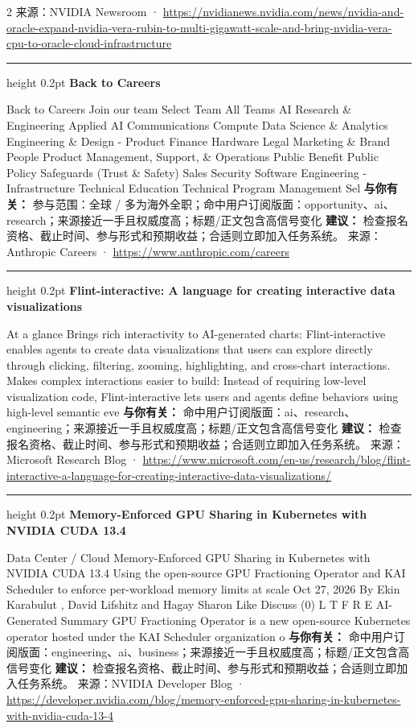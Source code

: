 \documentclass[10.5pt]{ctexart}
\begin{document}
\begin{multicols}{2}
{\footnotesize\color{ormuted} 来源：NVIDIA Newsroom · \url{https://nvidianews.nvidia.com/news/nvidia-and-oracle-expand-nvidia-vera-rubin-to-multi-gigawatt-scale-and-bring-nvidia-vera-cpu-to-oracle-cloud-infrastructure}}
\vspace{2mm}
\hrule height 0.2pt
\vspace{2mm}
{\large\bfseries Back to Careers}\par
Back to Careers Join our team Select Team All Teams AI Research \& Engineering Applied AI Communications Compute Data Science \& Analytics Engineering \& Design - Product Finance Hardware Legal Marketing \& Brand People Product Management, Support, \& Operations Public Benefit Public Policy Safeguards (Trust \& Safety) Sales Security Software Engineering - Infrastructure Technical Education Technical Program Management Sel
\textbf{与你有关：} 参与范围：全球 / 多为海外全职；命中用户订阅版面：opportunity、ai、research；来源接近一手且权威度高；标题/正文包含高信号变化
\textbf{建议：} 检查报名资格、截止时间、参与形式和预期收益；合适则立即加入任务系统。
{\footnotesize\color{ormuted} 来源：Anthropic Careers · \url{https://www.anthropic.com/careers}}
\vspace{2mm}
\hrule height 0.2pt
\vspace{2mm}
{\large\bfseries Flint-interactive: A language for creating interactive data visualizations}\par
At a glance Brings rich interactivity to AI-generated charts: Flint-interactive enables agents to create data visualizations that users can explore directly through clicking, filtering, zooming, highlighting, and cross-chart interactions. Makes complex interactions easier to build: Instead of requiring low-level visualization code, Flint-interactive lets users and agents define behaviors using high-level semantic eve
\textbf{与你有关：} 命中用户订阅版面：ai、research、engineering；来源接近一手且权威度高；标题/正文包含高信号变化
\textbf{建议：} 检查报名资格、截止时间、参与形式和预期收益；合适则立即加入任务系统。
{\footnotesize\color{ormuted} 来源：Microsoft Research Blog · \url{https://www.microsoft.com/en-us/research/blog/flint-interactive-a-language-for-creating-interactive-data-visualizations/}}
\vspace{2mm}
\hrule height 0.2pt
\vspace{2mm}
{\large\bfseries Memory-Enforced GPU Sharing in Kubernetes with NVIDIA CUDA 13.4}\par
Data Center / Cloud Memory-Enforced GPU Sharing in Kubernetes with NVIDIA CUDA 13.4 Using the open-source GPU Fractioning Operator and KAI Scheduler to enforce per-workload memory limits at scale Oct 27, 2026 By Ekin Karabulut , David Lifshitz and Hagay Sharon Like Discuss (0) L T F R E AI-Generated Summary GPU Fractioning Operator is a new open-source Kubernetes operator hosted under the KAI Scheduler organization o
\textbf{与你有关：} 命中用户订阅版面：engineering、ai、business；来源接近一手且权威度高；标题/正文包含高信号变化
\textbf{建议：} 检查报名资格、截止时间、参与形式和预期收益；合适则立即加入任务系统。
{\footnotesize\color{ormuted} 来源：NVIDIA Developer Blog · \url{https://developer.nvidia.com/blog/memory-enforced-gpu-sharing-in-kubernetes-with-nvidia-cuda-13-4}}
\end{multicols}
\end{document}
